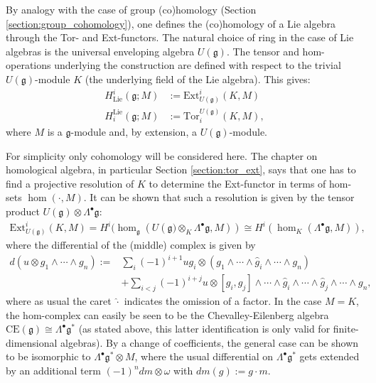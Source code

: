     By analogy with the case of group (co)homology (Section \ref{section:group_cohomology}), one defines the (co)homology of a Lie algebra through the Tor- and Ext-functors. The natural choice of ring in the case of Lie algebras is the universal enveloping algebra $U(\mathfrak{g})$. The tensor and hom-operations underlying the construction are defined with respect to the trivial $U(\mathfrak{g})$-module $K$ (the underlying field of the Lie algebra). This gives:
    \begin{align}
        H^i_\mathrm{Lie}(\mathfrak{g};M) &:= \mathrm{Ext}^i_{U(\mathfrak{g})}(K,M)\\
        H_i^\mathrm{Lie}(\mathfrak{g};M) &:= \mathrm{Tor}_i^{U(\mathfrak{g})}(K,M),
    \end{align}
    where $M$ is a $\mathfrak{g}$-module and, by extension, a $U(\mathfrak{g})$-module.

    For simplicity only cohomology will be considered here. The chapter on homological algebra, in particular Section \ref{section:tor_ext}, says that one has to find a projective resolution of $K$ to determine the Ext-functor in terms of hom-sets $\hom(\cdot, M)$. It can be shown that such a resolution is given by the tensor product $U(\mathfrak{g})\otimes\Lambda^\bullet\mathfrak{g}$:
    \begin{gather}
        \mathrm{Ext}^i_{U(\mathfrak{g})}(K,M) = H^i(\hom_\mathfrak{g}(U(\mathfrak{g)}\otimes_K\Lambda^\bullet\mathfrak{g},M))\cong H^i(\hom_K(\Lambda^\bullet\mathfrak{g},M)),
    \end{gather}
    where the differential of the (middle) complex is given by
    \begin{align}
        d(u\otimes g_1\wedge\cdots\wedge g_n) := &\sum_i(-1)^{i+1}ug_i\otimes(g_1\wedge\cdots\wedge\hat{g}_i\wedge\cdots\wedge g_n)\\
        &+\sum_{i<j}(-1)^{i+j}u\otimes[g_i,g_j]\wedge\cdots\wedge\hat{g}_i\wedge\cdots\wedge\hat{g}_j\wedge\cdots\wedge g_n\nonumber,
    \end{align}
    where as usual the caret $\hat\cdot$ indicates the omission of a factor. In the case $M=K$, the hom-complex can easily be seen to be the Chevalley-Eilenberg algebra $\mathrm{CE}(\mathfrak{g})\cong\Lambda^\bullet\mathfrak{g}^*$ (as stated above, this latter identification is only valid for finite-dimensional algebras). By a change of coefficients, the general case can be shown to be isomorphic to $\Lambda^\bullet\mathfrak{g}^*\otimes M$, where the usual differential on $\Lambda^\bullet\mathfrak{g}^*$ gets extended by an additional term $(-1)^ndm\otimes\omega$ with $dm(g):=g\cdot m$.

